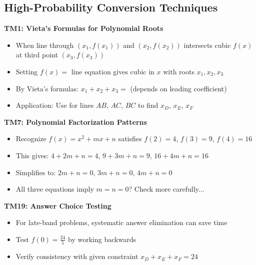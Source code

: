 \documentclass[]{article}
\begin{document}
\begin{techniquesbox}
\subsection*{High-Probability Conversion Techniques}

\textbf{TM1: Vieta's Formulas for Polynomial Roots}
\begin{itemize}[leftmargin=*]
    \item When line through $(x_1, f(x_1))$ and $(x_2, f(x_2))$ intersects cubic $f(x)$ at third point $(x_3, f(x_3))$
    \item Setting $f(x) = $ line equation gives cubic in $x$ with roots $x_1, x_2, x_3$
    \item By Vieta's formulas: $x_1 + x_2 + x_3 = $ (depends on leading coefficient)
    \item Application: Use for lines $AB$, $AC$, $BC$ to find $x_D$, $x_E$, $x_F$
\end{itemize}

\textbf{TM7: Polynomial Factorization Patterns}
\begin{itemize}[leftmargin=*]
    \item Recognize $f(x) = x^2 + mx + n$ satisfies $f(2) = 4$, $f(3) = 9$, $f(4) = 16$
    \item This gives: $4 + 2m + n = 4$, $9 + 3m + n = 9$, $16 + 4m + n = 16$
    \item Simplifies to: $2m + n = 0$, $3m + n = 0$, $4m + n = 0$
    \item All three equations imply $m = n = 0$? Check more carefully...
\end{itemize}

\textbf{TM19: Answer Choice Testing}
\begin{itemize}[leftmargin=*]
    \item For late-band problems, systematic answer elimination can save time
    \item Test $f(0) = \frac{24}{5}$ by working backwards
    \item Verify consistency with given constraint $x_D + x_E + x_F = 24$
\end{itemize}
\end{techniquesbox}
\end{document}
